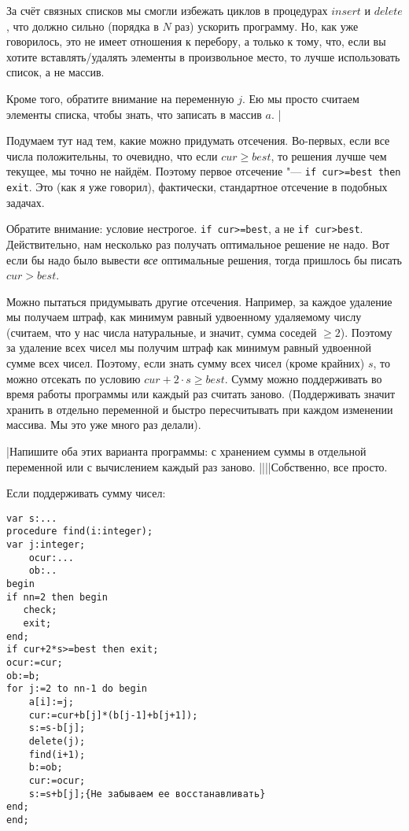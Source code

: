 За счёт связных списков мы смогли избежать циклов в процедурах $insert$ и $delete$, что должно сильно (порядка в $N$ раз) ускорить программу. Но, как уже говорилось, это не имеет отношения к 
перебору, а только к тому, что, если вы хотите вставлять/удалять элементы в произвольное место, то лучше 
использовать список, а не массив.

Кроме того, обратите внимание на переменную $j$. Ею мы просто считаем элементы списка, чтобы знать, что записать в массив $a$.
|


Подумаем тут над тем, какие можно придумать отсечения. Во-первых, если все числа положительны, 
то очевидно, что если $cur\geq best$, то решения лучше чем текущее, мы точно не найдём. Поэтому первое отсечение "--- \texttt{if cur>=best then exit}. Это (как я уже говорил), фактически, стандартное отсечение в подобных задачах.

Обратите внимание: условие нестрогое. \texttt{if cur>=best}, а не \texttt{if cur>best}. Действительно, нам 
несколько раз получать оптимальное решение не надо. Вот если бы надо было вывести \textit{все} оптимальные решения, тогда пришлось бы писать $cur>best$.

Можно пытаться придумывать другие отсечения. Например, за каждое удаление мы получаем штраф, 
как минимум равный удвоенному удаляемому числу (считаем, что у нас числа натуральные, и значит, сумма 
соседей $\geq 2$). Поэтому за удаление всех чисел мы получим штраф как минимум равный удвоенной 
сумме всех чисел. Поэтому, если знать сумму всех чисел (кроме крайних) $s$, то можно отсекать по 
условию $cur+2\cdot s\geq best$. Сумму можно поддерживать во время работы программы или каждый раз 
считать заново. (Поддерживать значит хранить в отдельно переменной и быстро пересчитывать при каждом 
изменении массива. Мы это уже много раз делали).


\task|Напишите оба этих варианта программы: с хранением суммы в отдельной переменной или с вычислением каждый раз заново.
||||Собственно, все просто.

Если поддерживать сумму чисел:

\begin{codesample}\begin{verbatim}
var s:...
procedure find(i:integer);
var j:integer;
    ocur:...
    ob:..
begin
if nn=2 then begin
   check;
   exit;
end;
if cur+2*s>=best then exit;
ocur:=cur;
ob:=b;
for j:=2 to nn-1 do begin
    a[i]:=j;
    cur:=cur+b[j]*(b[j-1]+b[j+1]);
    s:=s-b[j];
    delete(j);
    find(i+1);
    b:=ob;
    cur:=ocur;
    s:=s+b[j];{Не забываем ее восстанавливать}
end;
end;
\end{verbatim}\end{codesample}

